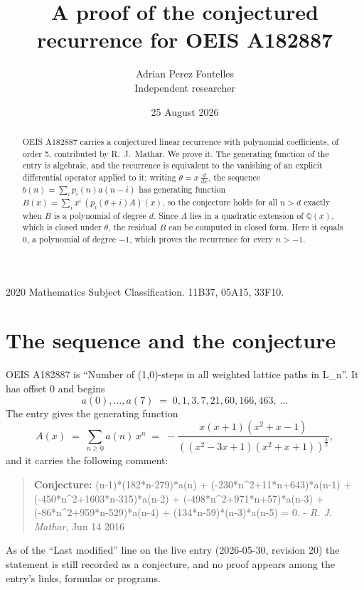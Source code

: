 \documentclass[11pt,a4paper]{article}
\title{A proof of the conjectured recurrence for OEIS A182887}
\author{Adrian Perez Fontelles\\ \small Independent researcher}
\date{25 August 2026}
\theoremstyle{plain}
\theoremstyle{definition}
\begin{document}
\maketitle

\begin{abstract}
OEIS A182887 carries a conjectured linear recurrence with polynomial coefficients, of
order 5, contributed by R.~J.~Mathar. We prove it. The generating function of the
entry is algebraic, and the recurrence is equivalent to the vanishing of an explicit
differential operator applied to it: writing $\theta=x\,\frac{d}{dx}$, the sequence
$b(n)=\sum_{i}p_{i}(n)a(n-i)$ has generating function
$B(x)=\sum_{i}x^{i}\,(p_{i}(\theta+i)A)(x)$, so the conjecture holds for all $n>d$ exactly
when $B$ is a polynomial of degree $d$. Since $A$ lies in a quadratic extension of
$\mathbb{Q}(x)$, which is closed under $\theta$, the residual $B$ can be computed in
closed form. Here it equals $0$, a polynomial of degree $-1$, which proves
the recurrence for every $n>-1$.
\end{abstract}

\noindent\small 2020 Mathematics Subject Classification. 11B37, 05A15, 33F10.\normalsize

\section{The sequence and the conjecture}

OEIS A182887 is ``Number of (1,0)-steps in all weighted lattice paths in L\_n''. It has offset $0$ and begins
\[
a(0),\dots,a(7)\;=\;0, 1, 3, 7, 21, 60, 166, 463,\ \dots
\]
The entry gives the generating function
\begin{equation}\label{eq:gf}
A(x)\;=\;\sum_{n\ge 0} a(n)\,x^{n}\;=\;- \frac{x \left(x + 1\right) \left(x^{2} + x - 1\right)}{\left(\left(x^{2} - 3 x + 1\right) \left(x^{2} + x + 1\right)\right)^{\frac{3}{2}}} ,
\end{equation}
and it carries the following comment:
\begin{quote}\small
\textbf{Conjecture:} (n-1)*(182*n-279)*a(n) + (-230*n\^{}2+11*n+643)*a(n-1) + (-450*n\^{}2+1603*n-315)*a(n-2) + (-498*n\^{}2+971*n+57)*a(n-3) + (-86*n\^{}2+959*n-529)*a(n-4) + (134*n-59)*(n-3)*a(n-5) = 0. - \emph{R. J. Mathar}, Jun 14 2016
\end{quote}
As of the ``Last modified'' line on the live entry (2026-05-30, revision 20) the
statement is still recorded as a conjecture, and no proof appears among the entry's links,
formulas or programs.
\end{document}
